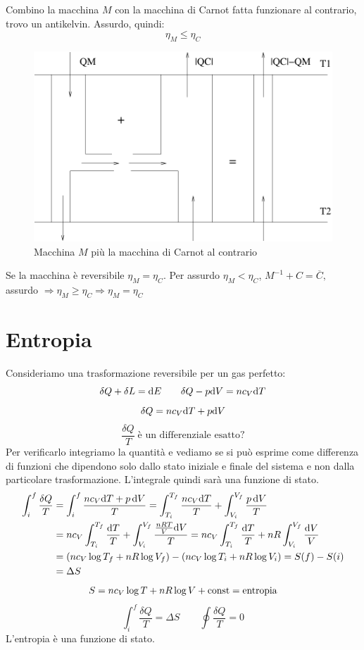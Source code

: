 Combino la macchina $M$ con la macchina di Carnot fatta funzionare al contrario, trovo un antikelvin. Assurdo, quindi: $$\eta_M\leq\eta_C$$
\begin{figure}[htbp]
\centering
\includegraphics[scale=0.5]{immagini/fisica1/M+c-1}
\caption{Macchina $M$ più la macchina di Carnot al contrario}
\end{figure}

\begin{Cor}
Se la macchina è reversibile $\eta_M=\eta_C$. Per assurdo $\eta_M<\eta_C$, $M^{-1}+C=\overline{C},$ assurdo $\Rightarrow \eta_M\geq\eta_C\Rightarrow \eta_M=\eta_C$
\end{Cor}

\section{Entropia}
Consideriamo una trasformazione reversibile per un gas perfetto:
$$\delta Q+\delta L=\mathrm{d} E\qquad \delta Q-p\mathrm{d} V=nc_V\mathrm{d} T$$
$$\delta Q=nc_V\mathrm{d} T+p\mathrm{d} V$$
$$\frac{\delta Q}{T}\;\text{è un differenziale esatto?}$$
Per verificarlo integriamo la quantità e vediamo se si può esprime come differenza di funzioni che dipendono solo dallo stato iniziale e finale del sistema e non dalla particolare trasformazione. L'integrale quindi sarà una funzione di stato.
\begin{align*}
\int_i^f\frac{\delta Q}{T}&=\int_i^f\frac{nc_V\mathrm{d} T+p\,\mathrm{d} V}{T}=\int_{T_i}^{T_f}\frac{nc_V\mathrm{d} T}{T}+\int_{V_i}^{V_f}\frac{p\,\mathrm{d} V}{T}\\
&=nc_V\int_{T_i}^{T_f}\frac{\mathrm{d} T}{T}+\int_{V_i}^{V_f}\frac{\frac{nRT}{V}\mathrm{d} V}{T}=nc_V\int_{T_i}^{T_f}\frac{\mathrm{d} T}{T}+nR\int_{V_i}^{V_f}\frac{\mathrm{d} V}{V}\\
&=(nc_V\log T_f+nR\log V_f)-(nc_V\log T_i+nR\log V_i)=S(f)-S(i)\\&=\Delta S
\end{align*}
$$S=nc_V\log T+nR\log V+\text{const}=\text{entropia}$$
$$\int_i^f\frac{\delta Q}{T}=\Delta S\qquad \oint\frac{\delta Q}{T}=0$$
L'entropia è una funzione di stato.
